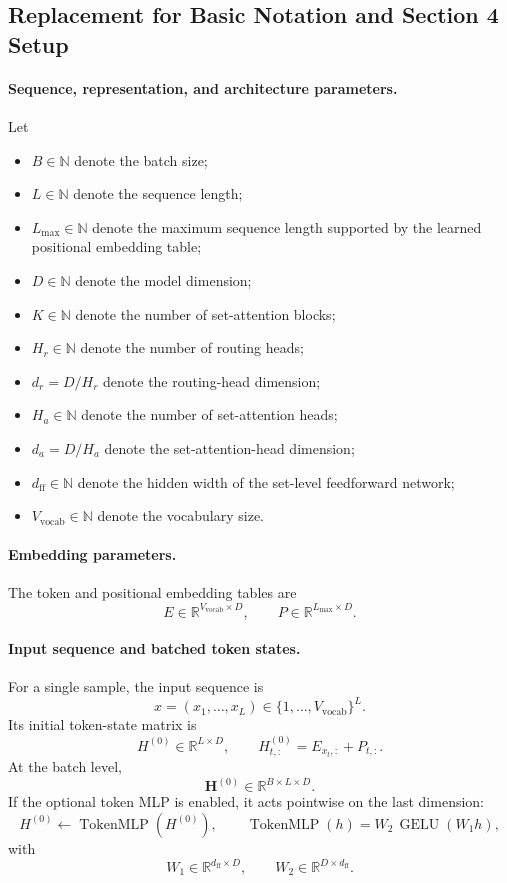 \subsection*{Replacement for Basic Notation and Section 4 Setup}

\paragraph{Sequence, representation, and architecture parameters.}
Let
\begin{itemize}
    \item \(B \in \mathbb N\) denote the batch size;
    \item \(L \in \mathbb N\) denote the sequence length;
    \item \(L_{\max} \in \mathbb N\) denote the maximum sequence length supported by the learned positional embedding table;
    \item \(D \in \mathbb N\) denote the model dimension;
    \item \(K \in \mathbb N\) denote the number of set-attention blocks;
    \item \(H_r \in \mathbb N\) denote the number of routing heads;
    \item \(d_r = D/H_r\) denote the routing-head dimension;
    \item \(H_a \in \mathbb N\) denote the number of set-attention heads;
    \item \(d_a = D/H_a\) denote the set-attention-head dimension;
    \item \(d_{\mathrm{ff}} \in \mathbb N\) denote the hidden width of the set-level feedforward network;
    \item \(V_{\mathrm{vocab}} \in \mathbb N\) denote the vocabulary size.
\end{itemize}

\paragraph{Embedding parameters.}
The token and positional embedding tables are
\[
E \in \mathbb R^{V_{\mathrm{vocab}}\times D},
\qquad
P \in \mathbb R^{L_{\max}\times D}.
\]

\paragraph{Input sequence and batched token states.}
For a single sample, the input sequence is
\[
x=(x_1,\dots,x_L)\in\{1,\dots,V_{\mathrm{vocab}}\}^L.
\]
Its initial token-state matrix is
\[
H^{(0)} \in \mathbb R^{L\times D},
\qquad
H^{(0)}_{t,:}=E_{x_t,:}+P_{t,:}.
\]
At the batch level,
\[
\mathbf H^{(0)} \in \mathbb R^{B\times L\times D}.
\]
If the optional token MLP is enabled, it acts pointwise on the last dimension:
\[
H^{(0)} \leftarrow \operatorname{TokenMLP}(H^{(0)}),
\qquad
\operatorname{TokenMLP}(h)=W_2\,\operatorname{GELU}(W_1 h),
\]
with
\[
W_1\in\mathbb R^{d_{\mathrm{ff}}\times D},
\qquad
W_2\in\mathbb R^{D\times d_{\mathrm{ff}}}.
\]

